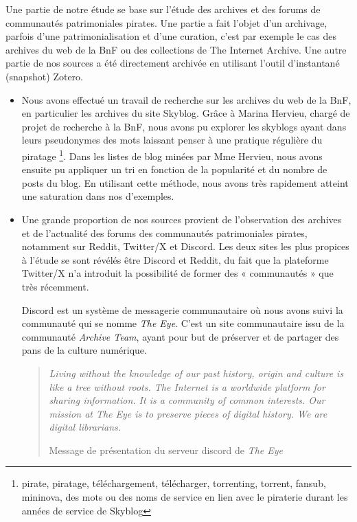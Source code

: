 Une partie de notre étude se base sur l'étude des archives et des forums de communautés patrimoniales pirates. Une partie a fait l'objet d'un archivage, parfois d'une patrimonialisation et d'une curation, c'est par exemple le cas des archives du web de la BnF ou des collections de The Internet Archive. Une autre partie de nos sources a été directement archivée en utilisant l'outil d'instantané (snapshot) Zotero.
\begin{itemize}
    \item Nous avons effectué un travail de recherche sur les archives du web de la BnF, en particulier les archives du site Skyblog. Grâce à Marina Hervieu, chargé de projet de recherche à la BnF, nous avons pu explorer les skyblogs ayant dans leurs pseudonymes des mots laissant penser à une pratique régulière du piratage \footnote{pirate, piratage, téléchargement, télécharger, torrenting, torrent, fansub, mininova, des mots ou des noms de service en lien avec le piraterie durant les années de service de Skyblog}. Dans les listes de blog minées par Mme Hervieu, nous avons ensuite pu appliquer un tri en fonction de la popularité et du nombre de posts du blog. En utilisant cette méthode, nous avons très rapidement atteint une saturation dans nos d'exemples. 
    
    \item Une grande proportion de nos sources provient de l'observation des archives et de l'actualité des forums des communautés patrimoniales pirates, notamment sur Reddit, Twitter/X et Discord. Les deux sites les plus propices à l'étude se sont révélés être Discord et Reddit, du fait que la plateforme Twitter/X n'a introduit la possibilité de former des « communautés » que très récemment. 
    
    \subitem Discord est un système de messagerie communautaire où nous avons suivi la communauté qui se nomme \textit{The Eye}. C'est un site communautaire issu de la communauté \textit{Archive Team}, ayant pour but de préserver et de partager des pans de la culture numérique. 

    \begin{quote}
        \textit{Living without the knowledge of our past history, origin and culture is like a tree without roots. The Internet is a worldwide platform for sharing information. It is a community of common interests.
        Our mission at The Eye is to preserve pieces of digital history. We are digital librarians.}
        
        Message de présentation du serveur discord de \textit{The Eye}
    \end{quote}


\end{itemize}
